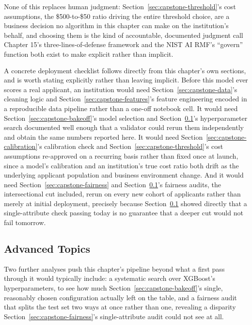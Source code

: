 \documentclass[../ai_in_finance]{subfiles}
\begin{document}
None of this replaces human judgment: Section~\ref{sec:capstone-threshold}'s cost assumptions, the \$500-to-\$50 ratio driving the entire threshold choice, are a business decision no algorithm in this chapter can make on the institution's behalf, and choosing them is the kind of accountable, documented judgment call Chapter 15's three-lines-of-defense framework and the NIST AI RMF's ``govern'' function both exist to make explicit rather than implicit.

A concrete deployment checklist follows directly from this chapter's own sections, and is worth stating explicitly rather than leaving implicit. Before this model ever scores a real applicant, an institution would need Section~\ref{sec:capstone-data}'s cleaning logic and Section~\ref{sec:capstone-features}'s feature engineering encoded in a reproducible data pipeline rather than a one-off notebook cell. It would need Section~\ref{sec:capstone-bakeoff}'s model selection and Section~\ref{sec:capstone-advanced}'s hyperparameter search documented well enough that a validator could rerun them independently and obtain the same numbers reported here. It would need Section~\ref{sec:capstone-calibration}'s calibration check and Section~\ref{sec:capstone-threshold}'s cost assumptions re-approved on a recurring basis rather than fixed once at launch, since a model's calibration and an institution's true cost ratio both drift as the underlying applicant population and business environment change. And it would need Section~\ref{sec:capstone-fairness} and Section~\ref{sec:capstone-advanced}'s fairness audits, the intersectional cut included, rerun on every new cohort of applicants rather than merely at initial deployment, precisely because Section~\ref{sec:capstone-advanced} showed directly that a single-attribute check passing today is no guarantee that a deeper cut would not fail tomorrow.

\subsection{Advanced Topics}
\label{sec:capstone-advanced}

Two further analyses push this chapter's pipeline beyond what a first pass through it would typically include: a systematic search over XGBoost's hyperparameters, to see how much Section~\ref{sec:capstone-bakeoff}'s single, reasonably chosen configuration actually left on the table, and a fairness audit that splits the test set two ways at once rather than one, revealing a disparity Section~\ref{sec:capstone-fairness}'s single-attribute audit could not see at all.
\end{document}
